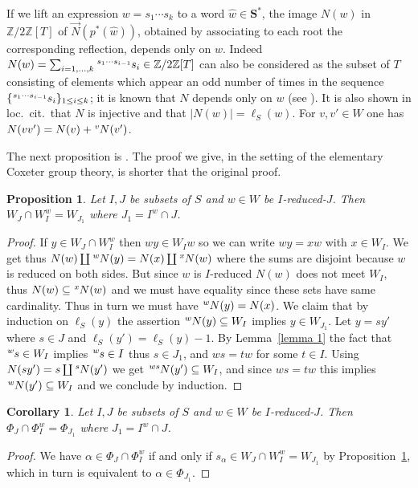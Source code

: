\documentclass{amsart}
\numberwithin{equation}{section}
\newtheorem{proposition}[equation]{Proposition}
\newtheorem{corollary}[equation]{Corollary}
\newcommand\vN{\vec N}
\newcommand\lexp[2]{\kern\scriptspace\vphantom{#2}^{#1}\kern-\scriptspace#2}
\newcommand\bS{{\mathbf S}}
\newcommand\BZ{{\mathbb Z}}
\begin{document}
If we lift an expression $w=s_1\cdots s_k$ to a word $\hat w\in \bS^*$, the
image   $N(w)$  in   $\BZ/2\BZ[T]$  of   $\vN(p^*(\hat  w))$,  obtained  by
associating to each root the corresponding reflection, depends only on $w$.
Indeed $N(w)=\sum_{i=1,\ldots,k}\lexp{s_1\cdots s_{i-1}}s_i \in\BZ/2\BZ[T]$
can  also be considered as  the subset of $T$  consisting of elements which
appear   an  odd  number  of   times  in  the  sequence  $\{\lexp{s_1\cdots
s_{i-1}}s_i\}_{1\le i\le k}$; it is known that $N$ depends only on $w$ (see
\cite[Chapter  IV, \S 1.4,  Lemme 2]{Bbk}). It  is also shown  in loc.\ cit.\ 
that  $N$ is injective  and  that  $|N(w)|=\ell_S(w)$.  For  $v,v'\in W$ one has
$N(vv')=N(v)+\lexp v N(v')$.

The  next proposition is \cite[Lemma 2]{solomon}. The proof we give, in the
setting  of  the  elementary  Coxeter  group  theory,  is  shorter that the
original proof.
\begin{proposition}\label{solomon} Let $I,J$ be subsets of $S$ and
$w\in W$ be $I$-reduced-$J$. Then $W_J\cap W_I^w=W_{J_1}$ where $J_1=I^w\cap J$.
\end{proposition}
\begin{proof}
If $y\in W_J\cap W_I^w$ then $wy\in W_Iw$ so we can write $wy=xw$ with $x\in
W_I$. We get thus $N(w)\coprod\lexp wN(y)=N(x)\coprod\lexp xN(w)$ where
the sums are disjoint because $w$ is reduced on both sides. But since
$w$ is $I$-reduced $N(w)$ does not meet $W_I$, thus $N(w)\subseteq \lexp xN(w)$
and we must have equality since these sets have same cardinality. Thus in
turn we must have $\lexp wN(y)=N(x)$. We claim that by induction on $\ell_S(y)$
the assertion $\lexp wN(y)\subseteq W_I$ implies $y\in W_{J_1}$. Let
$y=sy'$ where $s\in J$ and $\ell_S(y')=\ell_S(y)-1$. By Lemma~\ref{lemma 1} 
the fact that $\lexp ws\in W_I$ implies $\lexp ws\in I$ thus $s\in J_1$,
and $ws=tw$ for some $t\in I$.
Using $N(sy')=s\coprod \lexp sN(y')$ we get $\lexp{ws}N(y')\subseteq W_I$,
and since $ws=tw$ this implies $\lexp wN(y')\subseteq W_I$ 
and we conclude by induction.
\end{proof}
\begin{corollary}\label{cor_solomon}
Let $I,J$ be subsets of $S$ and
$w\in W$ be $I$-reduced-$J$. Then $\Phi_J\cap \Phi_I^w=\Phi_{J_1}$ where $J_1=I^w\cap J$.
\end{corollary}
\begin{proof}
We have $\alpha\in\Phi_J\cap\Phi_I^w$ if and only if $s_\alpha\in W_J\cap W_I^w=W_{J_1}$ by
Proposition~\ref{solomon}, which in turn is equivalent to $\alpha\in \Phi_{J_1}$.  
\end{proof}
\end{document}
